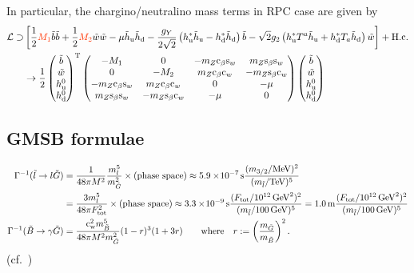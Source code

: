 \documentclass[CheatSheet]{subfiles}
\begin{document}
In particular, the chargino/neutralino mass terms in RPC case are given by
\begin{align}
 \mathcal L\supset
&\left[
  \frac12{\C{M_1}}\tib\tib
+ \frac12{\C{M_2}}\tiw\tiw
- \mu\thu\thd
- \frac{g_Y}{2\sqrt2} \left(\hu^*\thu-\hd^*\thd\right)\tib
- \sqrt{2}{g_2} \left(\hu^*T^a\thu+\hd^*T_a\thd\right)\tiw
\right]+\text{H.c.}
\\
&\to
\frac{1}{2}
\begin{pmatrix}\tib \\ \tiw \\ \huz \\ \hdz\end{pmatrix}^\TT
\begin{pmatrix}
 -M_1 & 0 & -m_Z \co{\beta} \si{w} & m_Z \si{\beta} \si{w} \\
 0 & -M_ 2 & m_Z \co{\beta} \co{w} & -m_Z \si{\beta} \co{w} \\
 -m_Z \co{\beta} \si{w} & m_Z \co{\beta} \co{w} & 0 & -\mu  \\
 m_Z \si{\beta} \si{w} & -m_Z \si{\beta} \co{w} & -\mu  & 0
\end{pmatrix}
\begin{pmatrix}\tib \\ \tiw \\ \huz \\ \hdz\end{pmatrix}
\end{align}

\clearpage

\subsection{GMSB formulae}
\begin{align}
 \Gamma^{-1}(\tilde l\to l\tilde G)
&=
\frac{1}{48\pi M^2}\frac{m_l^5}{m_{\tilde G}^2}\times\text{(phase space)}
\approx5.9\EE-7\unit{s} \frac{(m_{3/2}/\text{MeV})^2}{(m_{\tilde l}/\text{TeV})^5}
\\&=
\frac{3m_l^5}{48\pi F\w{tot}^2}\times\text{(phase space)}
\approx3.3\EE-9\unit{s} \frac{(F\w{tot}/10^{12}\GeV^2)^2}{(m_{\tilde l}/100\GeV)^5}
=1.0\unit{m} \frac{(F\w{tot}/10^{12}\GeV^2)^2}{(m_{\tilde l}/100\GeV)^5}
\\
 \Gamma^{-1}(\tilde B\to \gamma\tilde G)
&=
\frac{\cw^2 m_{\tilde B}^5}{48\pi M^2m_{\tilde G}^2}(1-r)^3(1+3r)
\qquad\text{where}\quad r:=\left(\frac{m_{\tilde G}}{m_{\tilde B}}\right)^2.
\end{align}
(cf.~\cite{Covi:2009bk})
\end{document}
